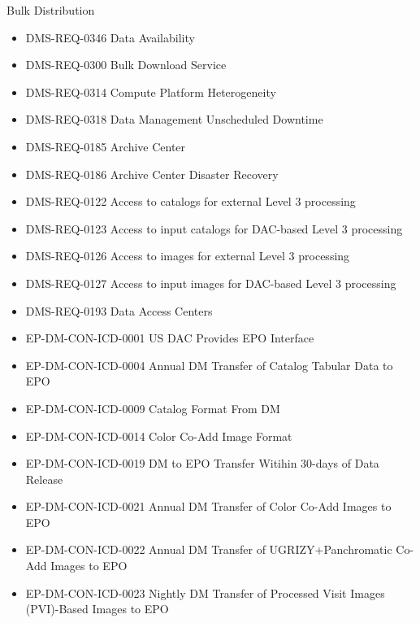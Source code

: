 Bulk Distribution \begin{itemize}
\item DMS-REQ-0346 Data Availability
\item DMS-REQ-0300 Bulk Download Service
\item DMS-REQ-0314 Compute Platform Heterogeneity
\item DMS-REQ-0318 Data Management Unscheduled Downtime
\item DMS-REQ-0185 Archive Center
\item DMS-REQ-0186 Archive Center Disaster Recovery
\item DMS-REQ-0122 Access to catalogs for external Level 3 processing
\item DMS-REQ-0123 Access to input catalogs for DAC-based Level 3 processing
\item DMS-REQ-0126 Access to images for external Level 3 processing
\item DMS-REQ-0127 Access to input images for DAC-based Level 3 processing
\item DMS-REQ-0193 Data Access Centers
\item EP-DM-CON-ICD-0001 US DAC Provides EPO Interface
\item EP-DM-CON-ICD-0004 Annual DM Transfer of Catalog Tabular Data to EPO
\item EP-DM-CON-ICD-0009 Catalog Format From DM
\item EP-DM-CON-ICD-0014 Color Co-Add Image Format
\item EP-DM-CON-ICD-0019 DM to EPO Transfer Witihin 30-days of Data Release
\item EP-DM-CON-ICD-0021 Annual DM Transfer of Color Co-Add Images to EPO
\item EP-DM-CON-ICD-0022 Annual DM Transfer of UGRIZY+Panchromatic Co-Add Images to EPO
\item EP-DM-CON-ICD-0023 Nightly DM Transfer of Processed Visit Images (PVI)-Based Images to EPO
\end{itemize}
